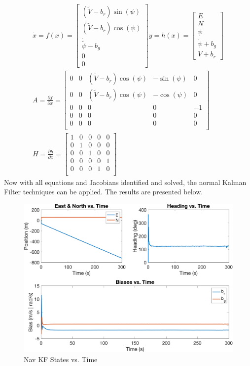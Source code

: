\documentclass{article}
\begin{document}
\begin{gather*}
    \dot{x} = f(x) = \begin{bmatrix}
        (\tilde{V} - b_r)\sin(\psi)\\
        (\tilde{V} - b_r)\cos(\psi)\\
        \dot{\tilde{\psi}} - b_g\\
        0\\
        0
    \end{bmatrix} y = h(x) = \begin{bmatrix}
        E\\
        N\\
        \psi\\
        \dot{\psi} + b_g\\
        V + b_r
    \end{bmatrix}\\
    A = \frac{\partial f}{\partial x} = \begin{bmatrix}
        0 & 0 & (\tilde{V}-b_r)\cos(\psi) & -\sin(\psi) & 0\\
        0 & 0 & (\tilde{V}-b_r)\cos(\psi) & -\cos(\psi) & 0\\
        0 & 0 & 0 & 0 & -1\\
        0 & 0 & 0 & 0 & 0\\
        0 & 0 & 0 & 0 & 0\\
    \end{bmatrix}\\
    H = \frac{\partial h}{\partial x} = \begin{bmatrix}
        1 & 0 & 0 & 0 & 0\\
        0 & 1 & 0 & 0 & 0\\
        0 & 0 & 1 & 0 & 0\\
        0 & 0 & 0 & 0 & 1\\
        0 & 0 & 0 & 1 & 0\\
    \end{bmatrix}
\end{gather*}
Now with all equations and Jacobians identified and solved, the normal Kalman Filter techniques can be applied.  The results are presented below.
\begin{figure}[H]
    \centering
    \includegraphics[width=0.75\linewidth]{../figures/p3a.png}
    \caption{Nav KF States vs. Time}\label{fig:p3a}
\end{figure}
\end{document}
